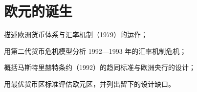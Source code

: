 \chapter{欧元的诞生}\label{ch:euro}

\begin{chapterguide}
\begin{guidegoals}
\item 描述欧洲货币体系与汇率机制（1979）的运作；
\item 用第二代货币危机模型分析 1992—1993 年的汇率机制危机；
\item 概括马斯特里赫特条约（1992）的趋同标准与欧洲央行的设计；
\item 用最优货币区标准评估欧元区，并列出留下的设计缺口。
\end{guidegoals}
\end{chapterguide}

\chapterstub
